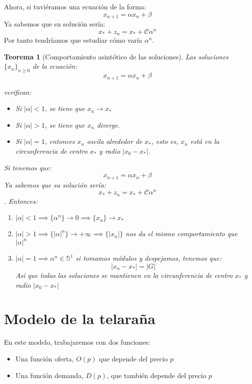 \documentclass[11pt, a4paper, titlepage]{article}
\makeatletter
\renewenvironment{proof}[1][\proofname] {\vspace{-15pt}\par\pushQED{\qed}\normalfont\topsep6\p@\@plus6\p@\relax\trivlist\item[\hskip\labelsep\it#1\@addpunct{.}]\ignorespaces}{\popQED\endtrivlist\@endpefalse}
\theoremstyle{theorem-style}
\newtheorem*{nth}{Teorema}
\theoremstyle{definition-style}
\theoremstyle{remark-style}
\theoremstyle{example-style}
\newenvironment{nlist}
{\begin{enumerate}
\renewcommand\labelenumi{(\emph{\roman{enumi})}}}
{\end{enumerate}}
\makeatother
\begin{document}
Ahora, si tuviéramos una ecuación de la forma:
\[
x_{n+1}= \alpha x_n + \beta
\]
Ya sabemos que su solución sería:
\[
x_* +z_n = x_* + \mathcal{C}\alpha^n
\]
Por tanto tendríamos que estudiar cómo varía $\alpha^n$.


\begin{nth}[Comportamiento asintótico de las soluciones]
	Las soluciones $\{x_n\}_{n\geq0}$ de la ecuación:
\[
x_{n+1} = \alpha x_n + \beta
\]

verifican:

\begin{itemize}
\item Si $|\alpha| < 1$, se tiene que ${x_n} \to x_*$
\item Si $|\alpha| > 1$, se tiene que ${x_n}$ diverge.
\item Si $|\alpha| = 1$, entonces ${x_n}$ oscila alrededor de $x_*$, esto es, $x_n$ está en la circunferencia de centro $x_*$ y radio $|x_0 - x_*|$.
\end{itemize}\vspace{0.5cm}

	\begin{proof}
	Si tenemos que:
	\[
x_{n+1}= \alpha x_n + \beta
\]
Ya sabemos que su solución sería:
\[
x_* +z_n = x_* + \mathcal{C}\alpha^n
\]. Entonces:
\begin{nlist}
	\item $|\alpha|< 1 \implies \{\alpha^n\}\to 0 \implies \{x_n\} \to x_*$
	\item $|\alpha|> 1 \implies \{|\alpha|^n\}\to +\infty \implies \{|x_n|\}$ nos da el mismo comportamiento que $|\alpha|^n$
	\item $|\alpha| = 1 \implies \alpha^n \in \mathbb{S}^1$ si tomamos módulos y despejamos, tenemos que:
	\[
	|x_n -x_*| = |G|
	\]
	Así que todas las soluciones se mantienen en la circunferencia de centro $x_*$ y radio $|x_0-x_*|$
\end{nlist}
\end{proof}
\end{nth}

\section{Modelo de la telaraña}
En este modelo, trabajaremos con dos funciones: 
\begin{itemize}
	\item Una función oferta, $O(p)$ que depende del precio $p$
	\item Una función demanda, $D(p)$, que también depende del precio $p$
\end{itemize}
\end{document}
